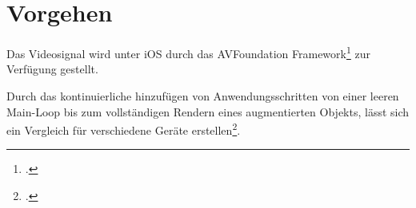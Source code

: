 \section{Vorgehen} %
\label{sec:vorgehen}
\begin{comment}
	Vorgehen: Analysemethoden vorstellen wie Algorithmen untersucht werden.
	Vergleich O-Notation
	Laufzeitanalyse
	Gleiche Kriterien (selbes Bild, selbes Video)
\end{comment}


Das Videosignal wird unter iOS durch das AVFoundation Framework\footcite{avfoundation} zur Verfügung gestellt.

Durch das kontinuierliche hinzufügen von Anwendungsschritten von einer leeren Main-Loop bis zum vollständigen Rendern
 eines augmentierten Objekts, lässt sich ein Vergleich für verschiedene Geräte erstellen\footcite[Vgl.][]{wagner09b}.

